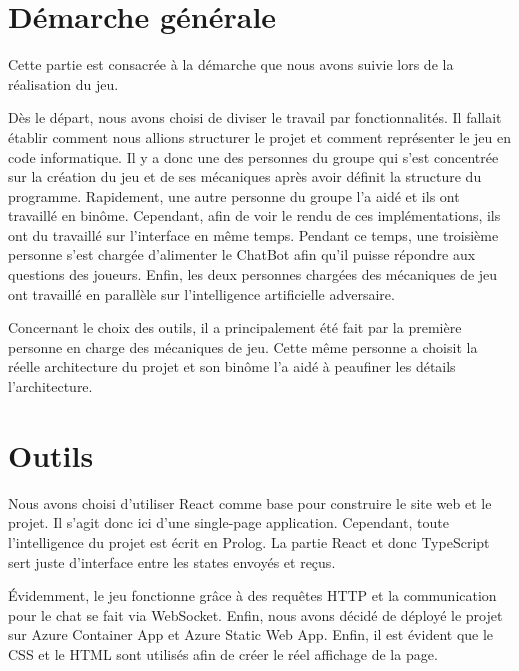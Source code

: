 \documentclass[a4paper, 11pt]{article}
\begin{document}
\newpage

\section{Démarche générale}

Cette partie est consacrée à la démarche que nous avons suivie lors de la réalisation du jeu.\newline

Dès le départ, nous avons choisi de diviser le travail par fonctionnalités. Il fallait établir comment nous allions structurer le projet et comment représenter le jeu en code informatique. Il y a donc une des personnes du groupe qui s'est concentrée sur la création du jeu et de ses mécaniques après avoir définit la structure du programme. Rapidement, une autre personne du groupe l'a aidé et ils ont travaillé en binôme. Cependant, afin de voir le rendu de ces implémentations, ils ont du travaillé sur l'interface en même temps. Pendant ce temps, une troisième personne s'est chargée d'alimenter le ChatBot afin qu'il puisse répondre aux questions des joueurs. Enfin, les deux personnes chargées des mécaniques de jeu ont travaillé en parallèle sur l'intelligence artificielle adversaire.\newline

Concernant le choix des outils, il a principalement été fait par la première personne en charge des mécaniques de jeu. Cette même personne a choisit la réelle architecture du projet et son binôme l'a aidé à peaufiner les détails l'architecture.

\section{Outils}

Nous avons choisi d'utiliser React comme base pour construire le site web et le projet. Il s'agit donc ici d'une single-page application. Cependant, toute l'intelligence du projet est écrit en Prolog. La partie React et donc TypeScript sert juste d'interface entre les states envoyés et reçus.\newline

Évidemment, le jeu fonctionne grâce à des requêtes HTTP et la communication pour le chat se fait via WebSocket. Enfin, nous avons décidé de déployé le projet sur Azure Container App et Azure Static Web App. Enfin, il est évident que le CSS et le HTML sont utilisés afin de créer le réel affichage de la page.

\newpage
\end{document}
